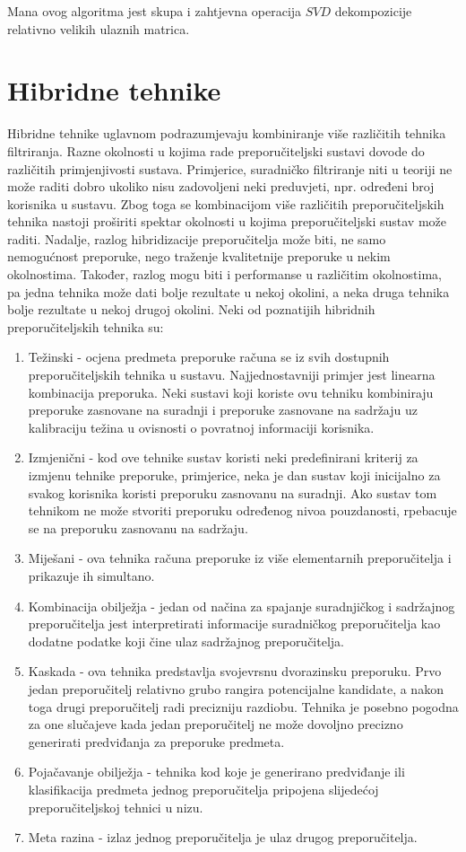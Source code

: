\documentclass[times, utf8, diplomski, numeric]{fer}
\begin{document}
Mana ovog algoritma jest skupa i zahtjevna operacija $SVD$ dekompozicije
relativno velikih ulaznih matrica.

\section{Hibridne tehnike}
Hibridne tehnike uglavnom podrazumjevaju kombiniranje više različitih tehnika
filtriranja. Razne okolnosti u kojima rade preporučiteljski sustavi dovode do
različitih primjenjivosti sustava. Primjerice, suradničko filtriranje niti u
teoriji ne može raditi dobro ukoliko nisu zadovoljeni neki preduvjeti, npr.
određeni broj korisnika u sustavu. Zbog toga se kombinacijom više različitih
preporučiteljskih tehnika nastoji proširiti spektar okolnosti u kojima
preporučiteljski sustav može raditi. Nadalje, razlog hibridizacije
preporučitelja može biti, ne samo nemogućnost preporuke, nego traženje
kvalitetnije preporuke u nekim okolnostima. Također, razlog mogu biti i
performanse u različitim okolnostima, pa jedna tehnika može dati bolje rezultate
u nekoj okolini, a neka druga tehnika bolje rezultate u nekoj drugoj okolini.
Neki od poznatijih hibridnih preporučiteljskih tehnika su: \cite{RSHandbook}

\begin{enumerate}
  \item Težinski - ocjena predmeta preporuke računa se iz svih dostupnih
  preporučiteljskih tehnika u sustavu. Najjednostavniji primjer jest linearna
  kombinacija preporuka. Neki sustavi koji koriste ovu tehniku kombiniraju
  preporuke zasnovane na suradnji i preporuke zasnovane na sadržaju uz
  kalibraciju težina u ovisnosti o povratnoj informaciji korisnika.
  \item Izmjenični - kod ove tehnike sustav koristi neki predefinirani kriterij
  za izmjenu tehnike preporuke, primjerice, neka je dan sustav koji inicijalno
  za svakog korisnika koristi preporuku zasnovanu na suradnji. Ako sustav tom
  tehnikom ne može stvoriti preporuku određenog nivoa pouzdanosti, rpebacuje se
  na preporuku zasnovanu na sadržaju.
  \item Miješani - ova tehnika računa preporuke iz više elementarnih
  preporučitelja i prikazuje ih simultano.
  \item Kombinacija obilježja - jedan od načina za spajanje suradnjičkog i
  sadržajnog preporučitelja jest interpretirati informacije suradničkog
  preporučitelja kao dodatne podatke koji čine ulaz sadržajnog preporučitelja.
  \item Kaskada - ova tehnika predstavlja svojevrsnu dvorazinsku preporuku. Prvo
  jedan preporučitelj relativno grubo rangira potencijalne kandidate, a nakon
  toga drugi preporučitelj radi precizniju razdiobu. Tehnika je posebno pogodna
  za one slučajeve kada jedan preporučitelj ne može dovoljno precizno generirati
  predviđanja za preporuke predmeta.
  \item Pojačavanje obilježja - tehnika kod koje je generirano predviđanje ili
  klasifikacija predmeta jednog preporučitelja pripojena slijedećoj
  preporučiteljskoj tehnici u nizu.
  \item Meta razina - izlaz jednog preporučitelja je ulaz drugog preporučitelja.
\end{enumerate}
\end{document}
